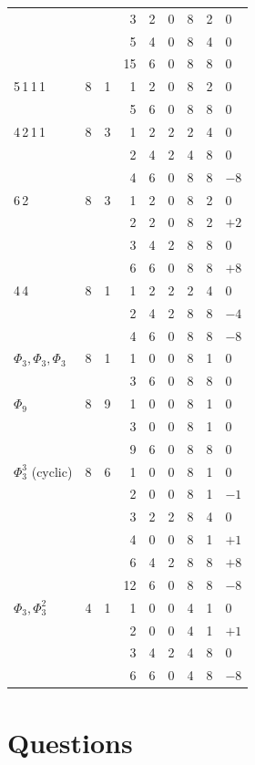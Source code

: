 \documentclass[12pt,a4paper]{amsart}
\theoremstyle{definition}
\begin{document}
\begin{table}[htbp]
\begin{tabular}{llrrrrlrl}
 &  &  & 3 & 2 & 0 & 8 & 2 & $0$\\
 &  &  & 5 & 4 & 0 & 8 & 4 & $0$\\
 &  &  & 15 & 6 & 0 & 8 & 8 & $0$\\
5\,1\,1\,1 & 8 & 1 & 1 & 2 & 0 & 8 & 2 & $0$\\
 &  &  & 5 & 6 & 0 & 8 & 8 & $0$\\
4\,2\,1\,1 & 8 & 3 & 1 & 2 & 2 & 2 & 4 & $0$\\
 &  &  & 2 & 4 & 2 & 4 & 8 & $0$\\
 &  &  & 4 & 6 & 0 & 8 & 8 & $-8$\\
6\,2 & 8 & 3 & 1 & 2 & 0 & 8 & 2 & $0$\\
 &  &  & 2 & 2 & 0 & 8 & 2 & $+2$\\
 &  &  & 3 & 4 & 2 & 8 & 8 & $0$\\
 &  &  & 6 & 6 & 0 & 8 & 8 & $+8$\\
4\,4 & 8 & 1 & 1 & 2 & 2 & 2 & 4 & $0$\\
 &  &  & 2 & 4 & 2 & 8 & 8 & $-4$\\
 &  &  & 4 & 6 & 0 & 8 & 8 & $-8$\\
$\Phi_3,\Phi_3,\Phi_3$ & 8 & 1 & 1 & 0 & 0 & 8 & 1 & $0$\\
 &  &  & 3 & 6 & 0 & 8 & 8 & $0$\\
$\Phi_9$ & 8 & 9 & 1 & 0 & 0 & 8 & 1 & $0$\\
 &  &  & 3 & 0 & 0 & 8 & 1 & $0$\\
 &  &  & 9 & 6 & 0 & 8 & 8 & $0$\\
$\Phi_3^3$ (cyclic) & 8 & 6 & 1 & 0 & 0 & 8 & 1 & $0$\\
 &  &  & 2 & 0 & 0 & 8 & 1 & $-1$\\
 &  &  & 3 & 2 & 2 & 8 & 4 & $0$\\
 &  &  & 4 & 0 & 0 & 8 & 1 & $+1$\\
 &  &  & 6 & 4 & 2 & 8 & 8 & $+8$\\
 &  &  & 12 & 6 & 0 & 8 & 8 & $-8$\\
$\Phi_3,\Phi_3^2$ & 4 & 1 & 1 & 0 & 0 & 4 & 1 & $0$\\
 &  &  & 2 & 0 & 0 & 4 & 1 & $+1$\\
 &  &  & 3 & 4 & 2 & 4 & 8 & $0$\\
 &  &  & 6 & 6 & 0 & 4 & 8 & $-8$\\
\bottomrule
\end{tabular}
\end{table}

\clearpage
\section{Questions}\label{sec:q}
\end{document}

